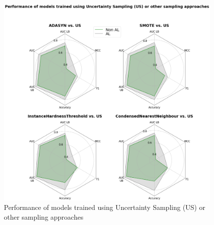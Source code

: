 \documentclass[a4paper,10pt]{article}
\begin{document}
\begin{figure}
    \centering
    \includegraphics[keepaspectratio=true, scale=0.32]{images/sampling_imbalanced_learn.png}
    \caption{Performance of models trained using Uncertainty Sampling (US) or other sampling approaches}
    \label{fig:1}
\end{figure}
\end{document}
